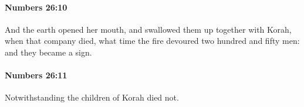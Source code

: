 		\paragraph{Numbers 26:10} %
			\label{NUMBERS-26-10}

			And the earth opened her mouth, and swallowed them up together with Korah, when that company died, what time the fire devoured two hundred and fifty men: and they became a sign.


		\paragraph{Numbers 26:11} %
			\label{NUMBERS-26-11}

			Notwithstanding the children of Korah died not.


